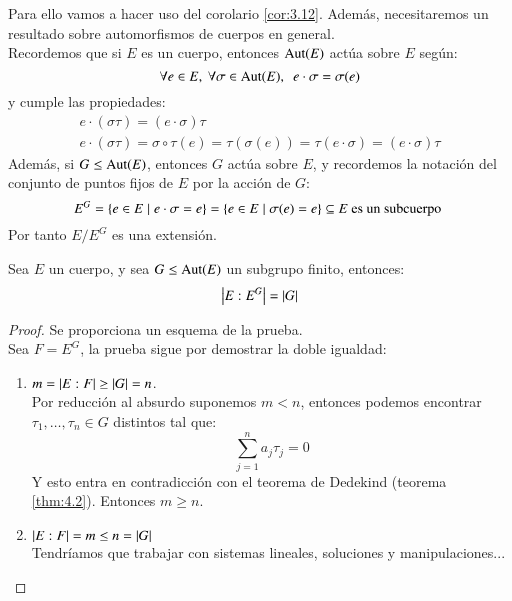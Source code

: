 Para ello vamos a hacer uso del corolario \ref{cor:3.12}. Además, necesitaremos un resultado sobre automorfismos de cuerpos en general.\\
Recordemos que si $E$ es un cuerpo, entonces $\mathrm{Aut}(E)$ actúa sobre $E$ según:
$$
    \forall e \in E,\ \forall \sigma \in \mathrm{Aut}(E),\ \ e \cdot \sigma = \sigma(e)
$$
y cumple las propiedades:
\begin{align*}
    e \cdot (\sigma \tau) = (e \cdot \sigma) \tau\\
    e \cdot (\sigma \tau) = \sigma \circ \tau (e) = \tau ( \sigma (e)) = \tau(e \cdot \sigma) = (e \cdot \sigma) \tau
\end{align*}
Además, si $G \leq \mathrm{Aut}(E)$, entonces $G$ actúa sobre $E$, y recordemos la notación del conjunto de puntos fijos de $E$ por la acción de $G$:
$$
    E^G = \left\{e \in E \mid e \cdot \sigma = e\right\} = \left\{e \in E \mid \sigma(e) = e\right\} \subseteq E \text{ es un subcuerpo }
$$
Por tanto $E/E^G$ es una extensión.

\begin{thm}[de Artin]\label{thm:4.1}
    Sea $E$ un cuerpo, y sea $G \leq \mathrm{Aut}(E)$ un subgrupo finito, entonces:
    $$
        \left|E:E^G\right| = \left|G\right|
    $$
\end{thm}
\begin{proof}
    Se proporciona un esquema de la prueba.\\
    Sea $F = E^G$, la prueba sigue por demostrar la doble igualdad:
    \begin{enumerate}
        \item $m = \left|E:F\right| \geq \left|G\right| = n$.\\
        Por reducción al absurdo suponemos $m < n$, entonces podemos encontrar $\tau_1, \ldots, \tau_n \in G$ distintos tal que:
        $$
            \sum_{j=1}^n a_j\tau_j = 0
        $$
        Y esto entra en contradicción con el teorema de Dedekind (teorema \ref{thm:4.2}). Entonces $m \geq n$.
        \item $\left|E:F\right| = m \leq n = \left|G\right|$\\
        Tendríamos que trabajar con sistemas lineales, soluciones y manipulaciones...
    \end{enumerate}
\end{proof}

